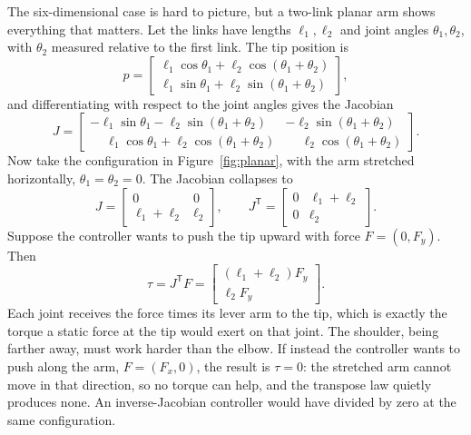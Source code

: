 \documentclass{article}
\newcommand{\T}{\mathsf{T}}
\begin{document}
The six-dimensional case is hard to picture, but a two-link planar arm shows everything that matters. Let the links have lengths $\ell_1,\ell_2$ and joint angles $\theta_1,\theta_2$, with $\theta_2$ measured relative to the first link. The tip position is
\begin{equation}
  p = \begin{bmatrix} \ell_1\cos\theta_1+\ell_2\cos(\theta_1+\theta_2)\\ \ell_1\sin\theta_1+\ell_2\sin(\theta_1+\theta_2)\end{bmatrix},
\end{equation}
and differentiating with respect to the joint angles gives the Jacobian
\begin{equation}
  J = \begin{bmatrix}
    -\ell_1\sin\theta_1-\ell_2\sin(\theta_1+\theta_2) & -\ell_2\sin(\theta_1+\theta_2)\\
    \phantom{-}\ell_1\cos\theta_1+\ell_2\cos(\theta_1+\theta_2) & \phantom{-}\ell_2\cos(\theta_1+\theta_2)
  \end{bmatrix}.
\end{equation}
Now take the configuration in Figure~\ref{fig:planar}, with the arm stretched horizontally, $\theta_1=\theta_2=0$. The Jacobian collapses to
\begin{equation}
  J = \begin{bmatrix} 0 & 0\\ \ell_1+\ell_2 & \ell_2\end{bmatrix}, \qquad
  J^\T = \begin{bmatrix} 0 & \ell_1+\ell_2\\ 0 & \ell_2\end{bmatrix}.
\end{equation}
Suppose the controller wants to push the tip upward with force $F=(0,F_y)$. Then
\begin{equation}
  \tau = J^\T F = \begin{bmatrix} (\ell_1+\ell_2)F_y\\ \ell_2 F_y\end{bmatrix}.
\end{equation}
Each joint receives the force times its lever arm to the tip, which is exactly the torque a static force at the tip would exert on that joint. The shoulder, being farther away, must work harder than the elbow. If instead the controller wants to push along the arm, $F=(F_x,0)$, the result is $\tau=0$: the stretched arm cannot move in that direction, so no torque can help, and the transpose law quietly produces none. An inverse-Jacobian controller would have divided by zero at the same configuration.
\end{document}
